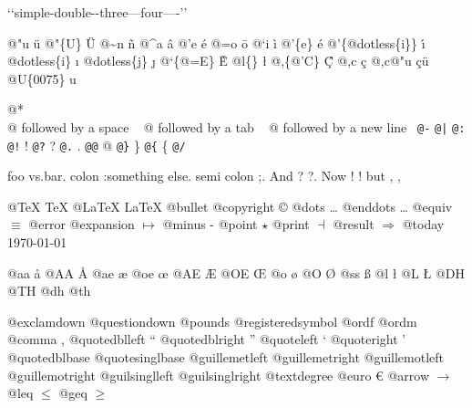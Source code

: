 \documentclass{book}
\begin{document}
\begin{titlepage}
`\hbox{}`simple-double-\hbox{}-three---four----'\hbox{}'\leavevmode{}\\

%
%
%
%

@"u \"{u} 
@"\{U\} \"{U} 
@\~{}n \~{n}
@\^{}a \^{a}
@'e \'{e}
@=o \={o}
@`i \`{i}
@'\{e\} \'{e}
@'\{@dotless\{i\}\} \'{\i{}} 
@dotless\{i\} \i{}
@dotless\{j\} \j{}
@`\{@=E\} \`{\={E}} 
@l\{\} \l{}
@,\{@'C\} \c{\'{C}}
@,c \c{c}
@,c@"u \c{c}\"{u} \leavevmode{}\\

@U\{0075\} u

@* \leavevmode{}\\
@ followed by a space
\ {}
@ followed by a tab
\ {}
@ followed by a new line
\ {}\texttt{@-} \-{}
\texttt{@|} 
\texttt{@:} \@
\texttt{@!} \@!
\texttt{@?} \@?
\texttt{@.} \@.
\texttt{@@} @
\texttt{@\}} \}
\texttt{@\{} \{
\texttt{@/} 

foo vs.\@ bar. 
colon :\@And something else.
semi colon ;\@.
And ? ?\@.
Now ! !\@@
but , ,\@

@TeX \TeX{}
@LaTeX \LaTeX{}
@bullet \textbullet{}
@copyright \copyright{}
@dots \dots{}\@
@enddots \dots{}
@equiv $\equiv{}$
@error 
@expansion $\mapsto{}$
@minus -
@point $\star{}$
@print $\dashv{}$
@result $\Rightarrow{}$
@today \today{}

@aa \aa{}
@AA \AA{}
@ae \ae{}
@oe \oe{}
@AE \AE{}
@OE \OE{}
@o \o{}
@O \O{}
@ss \ss{}
@l \l{}
@L \L{}
@DH \DH{}
@TH \TH{}
@dh \dh{}
@th \th{}

@exclamdown \textexclamdown{}
@questiondown \textquestiondown{}
@pounds \textsterling{}
@registeredsymbol \circledR{}
@ordf \textordfeminine{}
@ordm \textordmasculine{}
@comma ,
@quotedblleft \textquotedblleft{}
@quotedblright \textquotedblright{}
@quoteleft \textquoteleft{}
@quoteright \textquoteright{}
@quotedblbase \quotedblbase{}
@quotesinglbase \quotesinglbase{}
@guillemetleft \guillemotleft{}
@guillemetright \guillemotright{}
@guillemotleft \guillemotleft{}
@guillemotright \guillemotright{}
@guilsinglleft \guilsinglleft{}
@guilsinglright \guilsinglright{}
@textdegree \textdegree{}
@euro \euro{}
@arrow $\rightarrow{}$
@leq $\leq{}$
@geq $\geq{}$


\end{titlepage}
\end{document}
